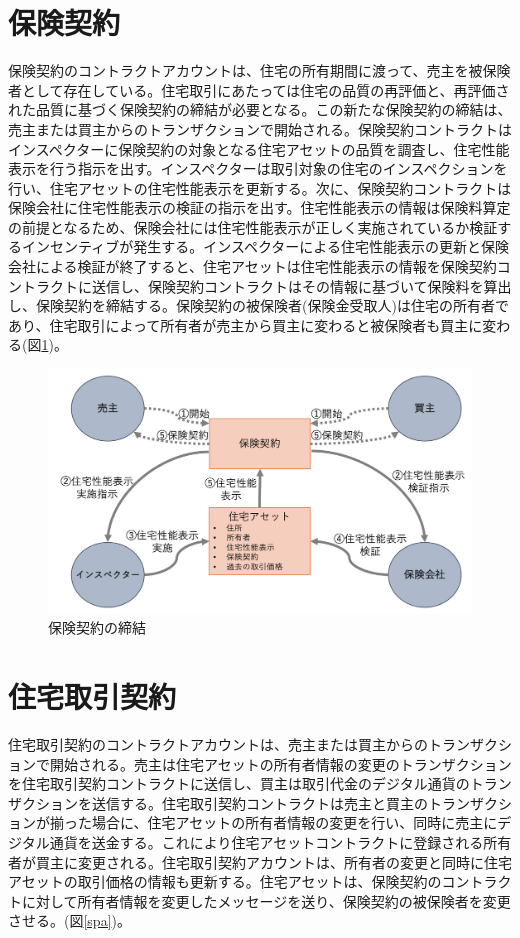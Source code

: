 \documentclass[a4paper,fontsize=11pt,report,notitlepage,line_length=38zw,number_of_lines=40,dvipdfmx]{jlreq}
\begin{document}
\section{保険契約}
保険契約のコントラクトアカウントは、住宅の所有期間に渡って、売主を被保険者として存在している。住宅取引にあたっては住宅の品質の再評価と、再評価された品質に基づく保険契約の締結が必要となる。この新たな保険契約の締結は、売主または買主からのトランザクションで開始される。保険契約コントラクトはインスペクターに保険契約の対象となる住宅アセットの品質を調査し、住宅性能表示を行う指示を出す。インスペクターは取引対象の住宅のインスペクションを行い、住宅アセットの住宅性能表示を更新する。次に、保険契約コントラクトは保険会社に住宅性能表示の検証の指示を出す。住宅性能表示の情報は保険料算定の前提となるため、保険会社には住宅性能表示が正しく実施されているか検証するインセンティブが発生する。インスペクターによる住宅性能表示の更新と保険会社による検証が終了すると、住宅アセットは住宅性能表示の情報を保険契約コントラクトに送信し、保険契約コントラクトはその情報に基づいて保険料を算出し、保険契約を締結する。保険契約の被保険者(保険金受取人)は住宅の所有者であり、住宅取引によって所有者が売主から買主に変わると被保険者も買主に変わる(図\ref{insurance})。

\begin{figure}
 \centering
 \includegraphics[width=12cm]{insurance.png}
 \caption{保険契約の締結}
 \label{insurance}
\end{figure}

\section{住宅取引契約}
住宅取引契約のコントラクトアカウントは、売主または買主からのトランザクションで開始される。売主は住宅アセットの所有者情報の変更のトランザクションを住宅取引契約コントラクトに送信し、買主は取引代金のデジタル通貨のトランザクションを送信する。住宅取引契約コントラクトは売主と買主のトランザクションが揃った場合に、住宅アセットの所有者情報の変更を行い、同時に売主にデジタル通貨を送金する。これにより住宅アセットコントラクトに登録される所有者が買主に変更される。住宅取引契約アカウントは、所有者の変更と同時に住宅アセットの取引価格の情報も更新する。住宅アセットは、保険契約のコントラクトに対して所有者情報を変更したメッセージを送り、保険契約の被保険者を変更させる。(図\ref{spa})。
\end{document}
